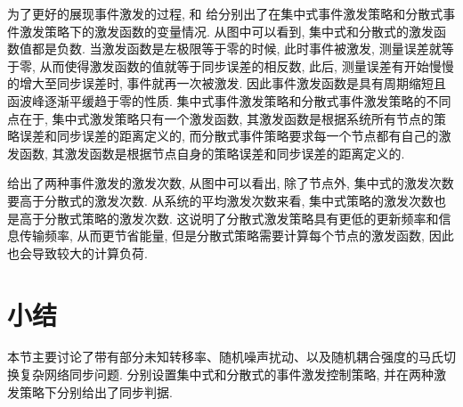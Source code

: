     为了更好的展现事件激发的过程,  和 给分别出了在集中式事件激发策略和分散式事件激发策略下的激发函数的变量情况. 从图中可以看到, 集中式和分散式的激发函数值都是负数. 当激发函数是左极限等于零的时候, 此时事件被激发, 测量误差就等于零, 从而使得激发函数的值就等于同步误差的相反数, 此后, 测量误差有开始慢慢的增大至同步误差时, 事件就再一次被激发. 因此事件激发函数是具有周期缩短且函波峰逐渐平缓趋于零的性质. 集中式事件激发策略和分散式事件激发策略的不同点在于, 集中式激发策略只有一个激发函数, 其激发函数是根据系统所有节点的策略误差和同步误差的距离定义的, 而分散式事件策略要求每一个节点都有自己的激发函数, 其激发函数是根据节点自身的策略误差和同步误差的距离定义的.

     给出了两种事件激发的激发次数, 从图中可以看出, 除了节点外, 集中式的激发次数要高于分散式的激发次数. 从系统的平均激发次数来看, 集中式策略的激发次数也是高于分散式策略的激发次数. 这说明了分散式激发策略具有更低的更新频率和信息传输频率, 从而更节省能量, 但是分散式策略需要计算每个节点的激发函数, 因此也会导致较大的计算负荷.

\section{小结}
    本节主要讨论了带有部分未知转移率、随机噪声扰动、以及随机耦合强度的马氏切换复杂网络同步问题. 分别设置集中式和分散式的事件激发控制策略, 并在两种激发策略下分别给出了同步判据.
